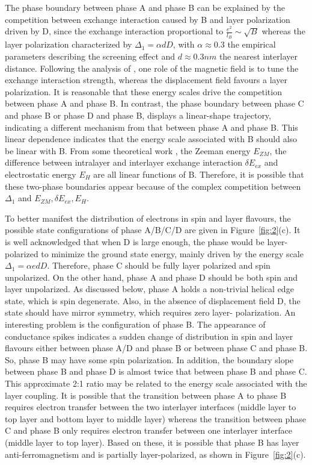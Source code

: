 The phase boundary between phase A and phase B can be explained by the competition between exchange interaction caused by B and layer polarization driven by D, 
since the exchange interaction proportional to $\frac{e^2}{l_B}\sim \sqrt{B}$ whereas the layer polarization characterized by $\Delta_1=\alpha dD$, 
with $\alpha\approx 0.3$ the empirical parameters describing the screening effect 
and $d\approx 0.3nm$ the nearest interlayer distance. Following the analysis of \cite{zhang2012hund, stepanov2019quantum}, 
one role of the magnetic field is to tune the exchange interaction strength, whereas the displacement field favours a layer polarization. 
It is reasonable that these energy scales drive the competition between phase A and phase B. 
In contrast, the phase boundary between phase C and phase B or phase D and phase B, displays a linear-shape trajectory, indicating a different mechanism from that between phase A and phase B. 
This linear dependence indicates that the energy scale associated with B should also be linear with B. 
From some theoretical work \cite{zhang2012hund}, the Zeeman energy $E_{ZM}$, the difference between intralayer and interlayer exchange interaction $\delta E_{ex}$ and electrostatic energy $E_H$ are all linear functions of B. 
Therefore, it is possible that these two-phase boundaries appear because of the complex competition between $\Delta_1$ and $E_{ZM}, \delta E_{ex}, E_H$.

To better manifest the distribution of electrons in spin and layer flavours, the possible state configurations of phase A/B/C/D are given in Figure~\ref{fig:2}(c).
It is well acknowledged that when D is large enough, the phase would be layer-polarized to minimize the ground state energy, mainly driven by the energy scale $\Delta_1=\alpha edD$. 
Therefore, phase C should be fully layer polarized and spin unpolarized. On the other hand, phase A and phase D should be both spin and layer unpolarized. 
As discussed below, phase A holds a non-trivial helical edge state, which is spin degenerate. 
Also, in the absence of displacement field D, the state should have mirror symmetry, which requires zero layer- polarization. 
An interesting problem is the configuration of phase B. The appearance of conductance spikes indicates a sudden change of distribution in spin and layer flavours either between phase A/D and phase B or between phase C and phase B. 
So, phase B may have some spin polarization. In addition, the boundary slope between phase B and phase D is almost twice that between phase B and phase C. 
This approximate 2:1 ratio may be related to the energy scale associated with the layer coupling. 
It is possible that the transition between phase A to phase B requires electron transfer between the two interlayer interfaces (middle layer to top layer and bottom layer to middle layer) 
whereas the transition between phase C and phase B only requires electron transfer between one interlayer interface (middle layer to top layer). 
Based on these, it is possible that phase B has layer anti-ferromagnetism and is partially layer-polarized, as shown in Figure~\ref{fig:2}(c).